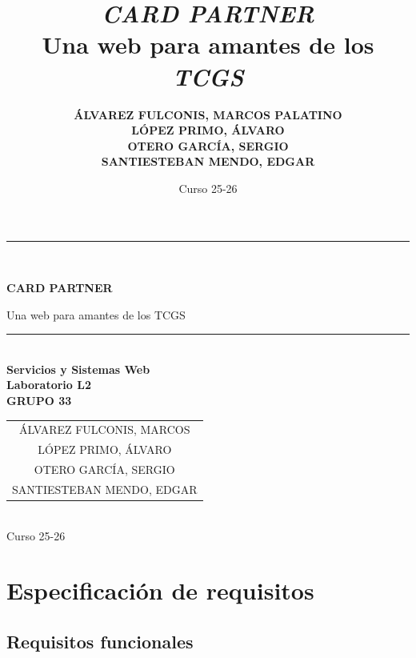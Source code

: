 \documentclass[10pt]{article}
\title{\textit{CARD PARTNER}\\ Una web para amantes de los \textit{TCGS}}
\author{
	\textbf{\small ÁLVAREZ FULCONIS, MARCOS PALATINO}\\
	\textbf{\small LÓPEZ PRIMO, ÁLVARO}\\
	\textbf{\small OTERO GARCÍA, SERGIO}\\
	\textbf{\small SANTIESTEBAN MENDO, EDGAR}
}
\date{Curso 25-26}
\begin{document}
	
	\begin{titlepage}
		\centering
		\rule{\linewidth}{0.2mm}\\[0.4cm]
		{\huge\bfseries CARD PARTNER\par}
		{\large Una web para amantes de los TCGS\par}
		\rule{\linewidth}{0.2mm}\\[1.5cm]
		{\Large\bfseries Servicios y Sistemas Web}\\[0.3cm]
		{\large\bfseries Laboratorio L2 \\ GRUPO 33}\\[1cm]
		{\Large \begin{tabular}{c} ÁLVAREZ FULCONIS, MARCOS \\ LÓPEZ PRIMO, ÁLVARO \\ OTERO GARCÍA, SERGIO \\ SANTIESTEBAN MENDO, EDGAR \end{tabular}}\\[1.5cm]
		{\Large Curso 25-26}
	\end{titlepage}
	
	\tableofcontents \newpage
	
	\setcounter{page}{1}
	
	\section{Especificación de requisitos}
		\subsection{Requisitos funcionales}
		
\end{document}
